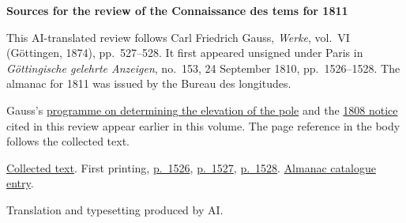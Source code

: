 \clearpage\thispagestyle{empty}
\begin{center}\textbf{Sources for the review of the Connaissance des tems for 1811}\end{center}
\noindent This AI-translated review follows Carl Friedrich Gauss, \textit{Werke}, vol.~VI (Göttingen, 1874), pp.~527--528. It first appeared unsigned under Paris in \textit{Göttingische gelehrte Anzeigen}, no.~153, 24 September 1810, pp.~1526--1528. The almanac for 1811 was issued by the Bureau des longitudes.
\par\smallskip\noindent Gauss’s \hyperlink{native-44}{programme on determining the elevation of the pole} and the \hyperlink{native-73}{1808 notice} cited in this review appear earlier in this volume. The page reference in the body follows the collected text.
\par\smallskip\noindent \href{https://gdz.sub.uni-goettingen.de/id/PPN236007467}{Collected text}. First printing, \href{https://images.p.sub.uni-goettingen.de/iiif/image/gdz:PPN319721507_1810:00001560/full/1650,/0/default.jpg}{p.~1526}, \href{https://images.p.sub.uni-goettingen.de/iiif/image/gdz:PPN319721507_1810:00001561/full/1650,/0/default.jpg}{p.~1527}, \href{https://images.p.sub.uni-goettingen.de/iiif/image/gdz:PPN319721507_1810:00001562/full/1650,/0/default.jpg}{p.~1528}. \href{https://cdt.imcce.fr/items/show/160}{Almanac catalogue entry}.
\par\smallskip\noindent Translation and typesetting produced by AI.
\clearpage
